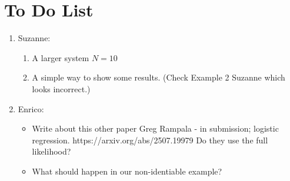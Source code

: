 \documentclass[11pt]{article}
\begin{document}
\section*{To Do List}
\begin{enumerate}
\item Suzanne:
\begin{enumerate}
    \item A larger system $N = 10$
    \item A simple way to show some results. (Check Example 2 Suzanne which looks incorrect.)
\end{enumerate}
\item Enrico:
\begin{itemize}
\item Write about this other paper Greg Rampala - in submission; logistic regression.
https://arxiv.org/abs/2507.19979
Do they use the full likelihood? 
\item What should happen in our non-identiable example? 
\end{itemize}
\end{enumerate}




\end{document}
